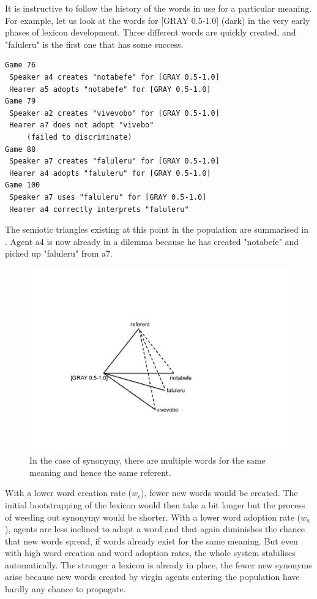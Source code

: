 It is instructive to follow the history of the words 
in use for a particular meaning. For 
example, let us look at the words for [GRAY 0.5-1.0] 
(dark) in the very early phases of lexicon development.
Three different words are quickly created, and 
"faluleru" is the first one that has some success. 
\begin{verbatim}
Game 76
 Speaker a4 creates "notabefe" for [GRAY 0.5-1.0]
 Hearer a5 adopts "notabefe" for [GRAY 0.5-1.0]
Game 79 
 Speaker a2 creates "vivevobo" for [GRAY 0.5-1.0]
 Hearer a7 does not adopt "vivebo" 
     (failed to discriminate)
Game 88 
 Speaker a7 creates "faluleru" for [GRAY 0.5-1.0]
 Hearer a4 adopts "faluleru" for [GRAY 0.5-1.0]
Game 100 
 Speaker a7 uses "faluleru" for [GRAY 0.5-1.0]
 Hearer a4 correctly interprets "faluleru"
\end{verbatim}
The semiotic triangles existing at this point in the population are 
summarised in . 
Agent {\bfshape  a4} is now already in a dilemma because he has created
"notabefe" and picked up "faluleru" from {\bfshape  a7}. 
\begin{figure}[htbp]
  \centerline{\includegraphics[width=.50\textwidth]{chap6/figs/triangle6}}
\caption{\label{triangle6} In the case of synonymy, 
there are multiple words for the same meaning and hence the 
same referent.}
\end{figure}

With a lower word creation rate ($w_{c}$), 
fewer new words would be created. The initial bootstrapping
of the lexicon would then take a bit longer but the 
process of weeding out synonymy would be shorter. 
With a lower word adoption rate ($w_{a}$), agents are
less inclined to adopt a word and that again diminishes
the chance that new words spread, if words already 
exist for the same meaning. But even with high word creation
and word adoption rates, the whole system stabilises automatically. 
The stronger a lexicon is already in place, the fewer
new synonyms arise because new words
created by virgin agents entering the population have hardly 
any chance to propagate. 

